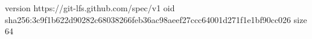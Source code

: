 version https://git-lfs.github.com/spec/v1
oid sha256:3c9f1b622d90282c68038266feb36ac98aeef27ccc64001d271f1e1bf90cc026
size 64
